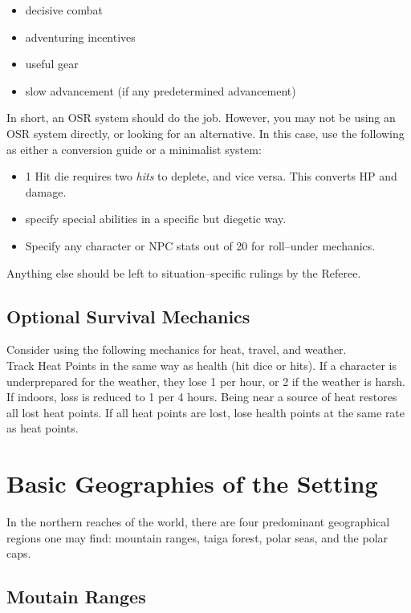 \documentclass[notitlepage]{article}
\begin{document}
\begin{multicols}{2}
\begin{itemize}
\item decisive combat
\item adventuring incentives
\item useful gear
\item slow advancement (if any predetermined advancement)
\end{itemize}

In short, an OSR system should do the job.
However, you may not be using an OSR system directly, or looking for an alternative.
In this case, use the following as either a conversion guide or a minimalist system:

\begin{itemize}
\item 1 Hit die requires two \emph{hits} to deplete, and vice versa. This converts HP and damage.
\item specify special abilities in a specific but diegetic way.
\item Specify any character or NPC stats out of 20 for roll--under mechanics.
\end{itemize}

Anything else should be left to situation--specific rulings by the Referee.

\subsection*{Optional Survival Mechanics}

Consider using the following mechanics for heat, travel, and weather. \\

Track Heat Points in the same way as health (hit dice or hits).
If a character is underprepared for the weather, they lose 1 per hour, or 2 if the weather is harsh.
If indoors, loss is reduced to 1 per 4 hours.
Being near a source of heat restores all lost heat points.
If all heat points are lost, lose health points at the same rate as heat points.


\section{Basic Geographies of the Setting}

In the northern reaches of the world, there are four predominant geographical regions one may find: mountain ranges, taiga forest, polar seas, and the polar caps.

\subsection{Moutain Ranges}


\end{multicols}
\end{document}
